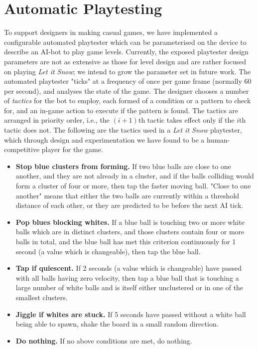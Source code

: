 \documentclass{IEEEtran}
\begin{document}
\section{Automatic Playtesting}
\label{Section:5}
To support designers in making casual games, we have implemented a configurable automated playtester which can be parameterised on the device to describe an AI-bot to play game levels. Currently, the exposed playtester design parameters are not as extensive as those for level design and are rather focused on playing \emph{Let it Snow}; we intend to grow the parameter set in future work. The automated playtester "ticks" at a frequency of once per game frame (normally 60 per second), and analyses the state of the game. The designer chooses a number of \emph{tactics} for the bot to employ, each formed of a condition or a pattern to check for, and an in-game action to execute if the pattern is found.
The tactics are arranged in priority order, i.e., the $(i+1)$th tactic takes effect only if the $i$th tactic does not. The following are the tactics used in a \emph{Let it Snow} playtester, which through design and experimentation we have found to be a human-competitive player for the game.

\begin{itemize}
\item \textbf{Stop blue clusters from forming.}  If two blue balls are close to one another, and they are not already in a cluster, and if the balls colliding would form a cluster of four or more, then tap the faster moving ball.
  "Close to one another" means that either the two balls are currently within a threshold distance of each other, or they are predicted to be before the next AI tick.
\item \textbf{Pop blues blocking whites.}  If a blue ball is touching two or more white balls which are in distinct clusters, and those clusters contain four or more balls in total, and the blue ball has met this criterion continuously for 1 second (a value which is changeable), then tap the blue ball.
\item \textbf{Tap if quiescent.}  If 2 seconds (a value which is changeable) have passed with all balls having zero velocity, then tap a blue ball that is touching a large number of white balls and is itself either unclustered or in one of the smallest clusters.
\item \textbf{Jiggle if whites are stuck.}  If 5 seconds have passed without a white ball being able to spawn, shake the board in a small random direction.
\item \textbf{Do nothing.}  If no above conditions are met, do nothing.
\end{itemize}
\end{document}
